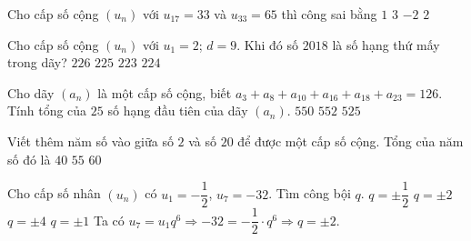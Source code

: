 \begin{ex}%
 Cho cấp số cộng $\left(u_n\right)$ với $u_{17}=33$ và $u_{33}=65$ thì công sai bằng
 \choice
 {$1$}
 {$3$}
 {$-2$}
 {\True $2$}
\end{ex}
\begin{ex}%
 Cho cấp số cộng $(u_n)$ với $u_1=2$; $d=9$. Khi đó số $2018$ là số hạng thứ mấy trong dãy?
 \choice
 {$226$}
 {\True $225$}
 {$223$}
 {$224$}
\end{ex}
\begin{ex}%
 Cho dãy $(a_n)$ là một cấp số cộng, biết $a_3+a_8+a_{10}+a_{16}+a_{18}+a_{23}=126$. Tính tổng của $25$ số hạng đầu tiên của dãy $(a_n)$.
 {$ 550$}
 {$ 552$}
 {\True $525 $}
\end{ex}
\begin{ex}%
 Viết thêm năm số vào giữa số $2$ và số $20$ để được một cấp số cộng. Tổng của năm số đó là
 {$40$}
 {\True $55$}
 {$60$}
\end{ex}
\begin{ex}%
 Cho cấp số nhân $(u_n)$ có $u_1=-\dfrac{1}{2}$, $u_7=-32$. Tìm công bội $q$.
 \choice
 {$q=\pm\dfrac{1}{2}$}
 {\True $q=\pm 2$}
 {$q=\pm 4$}
 {$q=\pm 1$}
 \loigiai
 {
 Ta có $u_7=u_1q^6\Rightarrow -32=-\dfrac{1}{2}\cdot q^6\Rightarrow q=\pm 2$.
 }
\end{ex}

